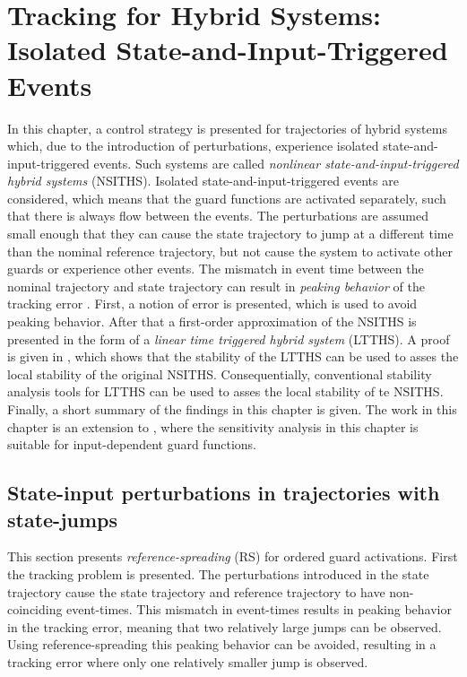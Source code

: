 \documentclass[../DC2017114Bouma.tex]{subfiles}
\begin{document}
\graphicspath{{03_Contribution/img/}}
\renewcommand{\chaptermark}[1]{\markboth{\thechapter.\ #1}{}}
\renewcommand{\sectionmark}[1]{\markright{#1}{}}

\pagestyle{fancyreport}
\cleartooddpage
\pagestyle{fancyreport}
\chapter{Tracking for Hybrid Systems: Isolated State-and-Input-Triggered Events}\label{ch:order}
In this chapter, a control strategy is presented for trajectories of hybrid systems which, due to the introduction of perturbations, experience isolated state-and-input-triggered events. Such systems are called \textit{nonlinear state-and-input-triggered hybrid systems} (NSITHS). Isolated state-and-input-triggered events are considered, which means that the guard functions are activated separately, such that there is always flow between the events. The perturbations are assumed small enough that they can cause the state trajectory to jump at a different time than the nominal reference trajectory, but not cause the system to activate other guards or experience other events. The mismatch in event time between the nominal trajectory and state trajectory can result in \textit{peaking behavior} of the tracking error \cite{Menini2001,Biemond2013}. First, a notion of error is presented, which is used to avoid peaking behavior. After that a first-order approximation of the NSITHS is presented in the form of a \textit{linear time triggered hybrid system} (LTTHS). A proof is given in \cite{Rijnen2017}, which shows that the stability of the LTTHS can be used to asses the local stability of the original NSITHS. Consequentially, conventional stability analysis tools for LTTHS can be used to asses the local stability of te NSITHS. Finally, a short summary of the findings in this chapter is given. The work in this chapter is an extension to \cite{Rijnen2017}, where the sensitivity analysis in this chapter is suitable for input-dependent guard functions.
%
%

\section{State-input perturbations in trajectories with state-jumps}
This section presents \textit{reference-spreading} (RS) for ordered guard activations. First the tracking problem is presented. The perturbations introduced in the state trajectory cause the state trajectory and reference trajectory to have non-coinciding event-times. This mismatch in event-times results in peaking behavior in the tracking error, meaning that two relatively large jumps can be observed. Using reference-spreading this peaking behavior can be avoided, resulting in a tracking error where only one relatively smaller jump is observed.
%
\end{document}
